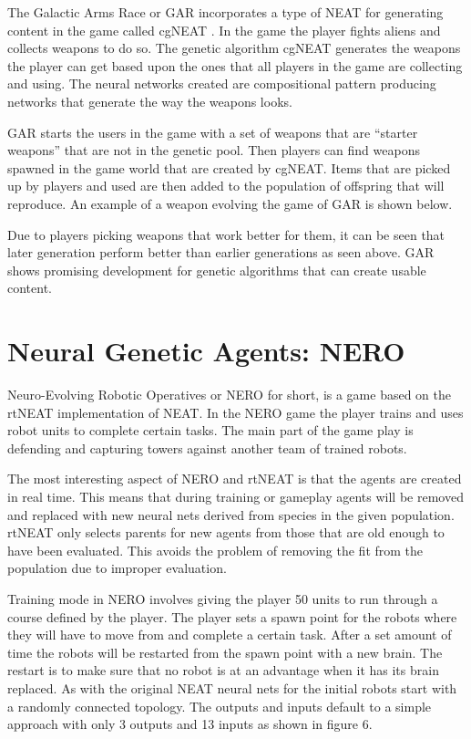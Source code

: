 \documentclass[12pt]{ucthesis} \newif\ifpdf \ifx\pdfoutput\undefined
\begin{document}
The Galactic Arms Race or GAR incorporates a type of NEAT for generating content
in the game called cgNEAT \cite{hastings2009evolving}. In the game the player
fights aliens and collects weapons to do so. The genetic algorithm cgNEAT generates the weapons the player
can get based upon the ones that all players in the game are collecting and
using. The neural networks created are compositional pattern producing networks
that generate the way the weapons looks\cite{hastings2009evolving}.

GAR starts the users in the game with a set of weapons that are “starter
weapons” that are not in the genetic pool. Then players can find weapons spawned
in the game world that are created by cgNEAT. Items that are picked up by
players and used are then added to the population of offspring that will
reproduce. An example of a weapon evolving the game of GAR is shown
below\cite{hastings2009evolving}.

Due to players picking weapons that work better for them, it can be seen that
later generation perform better than earlier generations as seen above. GAR
shows promising development for genetic algorithms that can create usable
content.

\section{Neural Genetic Agents: NERO}
  
Neuro-Evolving Robotic Operatives or NERO for short, is a game based on the
rtNEAT implementation of NEAT\cite{stanley:cig05}. In the NERO game the player
trains and uses robot units to complete certain tasks. The main part of the game play is
defending and capturing towers against another team of trained robots.

The most interesting aspect of NERO and rtNEAT is that the agents are created in
real time. This means that during training or gameplay agents will be removed
and replaced with new neural nets derived from species in the given population.
rtNEAT only selects parents for new agents from those that are old enough to
have been evaluated. This avoids the problem of removing the fit from the
population due to improper evaluation.

Training mode in NERO involves giving the player 50 units to run through a
course defined by the player. The player sets a spawn point for the robots where
they will have to move from and complete a certain task. After a set amount of
time the robots will be restarted from the spawn point with a new brain. The
restart is to make sure that no robot is at an advantage when it has its brain
replaced. As with the original NEAT neural nets for the initial robots start
with a randomly connected topology. The outputs and inputs default to a simple
approach with only 3 outputs and 13 inputs as shown in figure 6.
\end{document}
